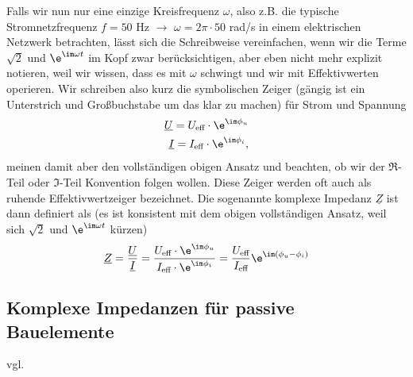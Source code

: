 Falls wir nun nur eine einzige Kreisfrequenz $\omega$, also z.B. die
typische Stromnetzfrequenz $f=50$ Hz $\rightarrow$ $\omega = 2\pi \cdot 50$ rad/s
in einem elektrischen Netzwerk betrachten, lässt sich die Schreibweise vereinfachen,
wenn wir die Terme $\sqrt{2}$ und $\e^{\im \omega t}$ im Kopf zwar berücksichtigen,
aber eben nicht mehr explizit notieren, weil wir wissen, dass es mit $\omega$
schwingt und wir mit Effektivwerten operieren.
Wir schreiben also kurz die symbolischen Zeiger (gängig ist ein Unterstrich
und Großbuchstabe um das klar zu machen) für Strom und Spannung
\begin{align}
\underline{U} = U_\text{eff} \cdot \e^{\im \phi_u}\\
\underline{I} = I_\text{eff} \cdot \e^{\im \phi_i},
\end{align}
meinen damit aber den vollständigen obigen Ansatz und beachten, ob wir der
$\Re$-Teil oder $\Im$-Teil Konvention folgen wollen.
%
Diese Zeiger werden oft auch als ruhende Effektivwertzeiger bezeichnet.
%
Die sogenannte komplexe Impedanz $\underline{Z}$ ist dann definiert als (es ist konsistent mit dem
obigen vollständigen Ansatz, weil sich $\sqrt{2}$ und $\e^{\im\omega t}$ kürzen)
\begin{align}
\underline{Z} =
\frac{\underline{U}}{\underline{I}} =
\frac{U_\text{eff} \cdot \e^{\im \phi_u}}{I_\text{eff} \cdot \e^{\im \phi_i}} =
\frac{U_\text{eff}}{I_\text{eff}} \e^{\im (\phi_u-\phi_i)}
\end{align}

\subsection{Komplexe Impedanzen für passive Bauelemente}

vgl. \cite[Kap. 10.3.5]{Marinescu2020}

